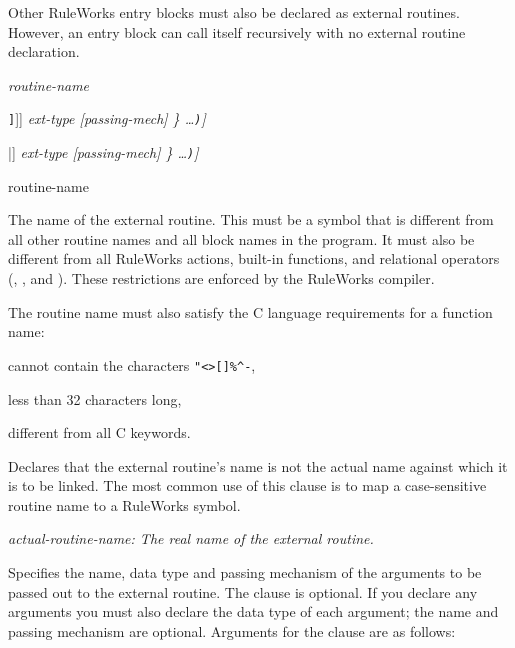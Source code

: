 Other RuleWorks entry blocks must also be declared as external
routines. However, an entry block can call itself recursively with no
external routine declaration.

\Format

 \it{routine-name}


\qquad[\co{(ACCEPTS} \{[\verb|<|\it{f-param-name}\verb|>|
[\verb|[|[\it{size}]\verb|]|]] \it{ext-type} [\it{passing-mech}]
\} \ldots\verb|)|]

\qquad[\co{(RETURNS} \{[\verb|<|\it{f-param-name}\verb|>|
[\verb|[|\it{size}\verb|]|] \it{ext-type} [\it{passing-mech}]
\} \ldots\verb|)|]

\begin{argument}
\item[routine-name]

  The name of the external routine. This must be a symbol that is
  different from all other routine names and all block names in the
  program. It must also be different from all RuleWorks actions,
  built-in functions, and relational operators (, ,
  and ). These restrictions are enforced by the RuleWorks
  compiler.

  The routine name must also satisfy the C language requirements for a
  function name:

  \qquad cannot contain the characters \verb|"<>[]%^-|,

  \qquad less than 32 characters long,

  \qquad different from all C keywords.
\end{argument}

\Clauses


Declares that the external routine's name is not the actual name
against which it is to be linked. The most common use of this clause
is to map a case-sensitive routine name to a RuleWorks symbol.

\it{actual-routine-name}: The real name of the external routine.


Specifies the name, data type and passing mechanism of the arguments
to be passed out to the external routine. The  clause is
optional. If you declare any arguments you must also declare the data
type of each argument; the name and passing mechanism are
optional. Arguments for the  clause are as follows:

